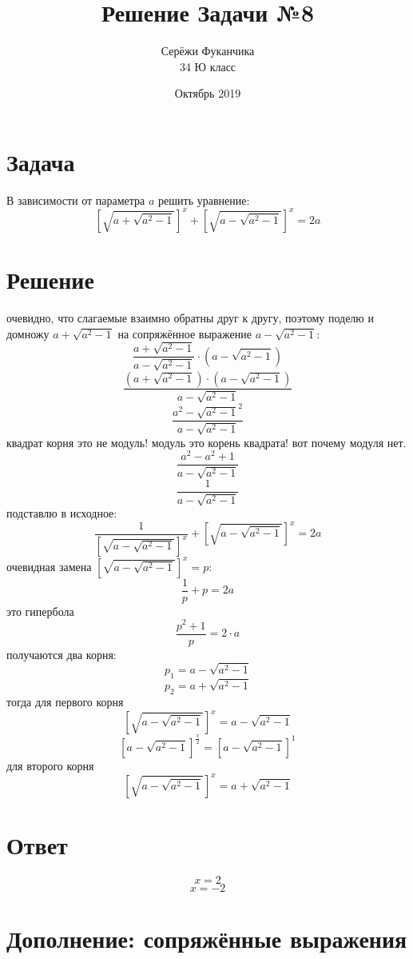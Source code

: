 \documentclass{article}
\title{Решение Задачи №8}
\author{Серёжи Фуканчика\\34 Ю класс}
\date{Октябрь 2019}
\begin{document}
\maketitle
\section{Задача}
В зависимости от параметра $a$ решить уравнение:
$$\left[\sqrt{a+\sqrt{a^2-1}}\right]^x+\left[\sqrt{a-\sqrt{a^2-1}}\right]^x=2a$$

\section{Решение}
очевидно, что слагаемые взаимно обратны друг к другу, поэтому поделю и домножу $a+\sqrt{a^2-1}$ на сопряжённое выражение $a-\sqrt{a^2-1}$:
$$\frac{a+\sqrt{a^2-1}}{a-\sqrt{a^2-1}}\cdot{(a-\sqrt{a^2-1})}$$
$$\frac{(a+\sqrt{a^2-1})\cdot{}(a-\sqrt{a^2-1})}{a-\sqrt{a^2-1}}$$
$$\frac{a^2-\sqrt{a^2-1}^2}{a-\sqrt{a^2-1}}$$
квадрат корня это не модуль! модуль это корень квадрата! вот почему модуля нет.
$$\frac{a^2-a^2+1}{a-\sqrt{a^2-1}}$$
$$\frac{1}{a-\sqrt{a^2-1}}$$
подставлю в исходное:
$$\frac{1}{\left[\sqrt{a - \sqrt{a^2-1}}\right]^x}+\left[\sqrt{a-\sqrt{a^2-1}}\right]^x=2a$$
очевидная замена $\left[\sqrt{a-\sqrt{a^2-1}}\right]^x=p$:
$$\frac{1}{p}+p=2a$$
это гипербола
$$\frac{p^2+1}{p}=2\cdot{}a$$
получаются два корня:
$$p_1=a-\sqrt{a^2-1}$$
$$p_2=a+\sqrt{a^2-1}$$
тогда для первого корня
$$\left[\sqrt{a-\sqrt{a^2-1}}\right]^x=a-\sqrt{a^2-1}$$
$$\left[a-\sqrt{a^2-1}\right]^{\frac{x}{2}}=\left[a-\sqrt{a^2-1}\right]^1$$
для второго корня
$$\left[\sqrt{a-\sqrt{a^2-1}}\right]^x=a+\sqrt{a^2-1}$$

\section{Ответ}
$$x=2$$
$$x=-2$$

\section{Дополнение: сопряжённые выражения}
\end{document}
